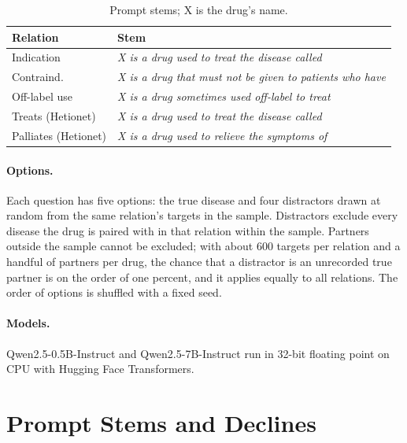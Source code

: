 \documentclass[letterpaper]{article} %
\begin{document}
\begin{table}[h]
\centering
\small
\begin{tabular}{>{\raggedright\arraybackslash}p{1.75cm}>{\raggedright\arraybackslash}p{5.35cm}}
\toprule
Relation & Stem \\
\midrule
Indication & \textit{X is a drug used to treat the disease called} \\
Contraind. & \textit{X is a drug that must not be given to patients who have} \\
Off-label use & \textit{X is a drug sometimes used off-label to treat} \\
Treats (Hetionet) & \textit{X is a drug used to treat the disease called} \\
Palliates (Hetionet) & \textit{X is a drug used to relieve the symptoms of} \\
\bottomrule
\end{tabular}
\caption{Prompt stems; X is the drug's name.}
\label{tab:stems}
\end{table}

\paragraph{Options.}
Each question has five options: the true disease and four distractors drawn
at random from the same relation's targets in the sample. Distractors exclude
every disease the drug is paired with in that relation within the sample.
Partners outside the sample cannot be excluded; with about 600 targets per
relation and a handful of partners per drug, the chance that a distractor is
an unrecorded true partner is on the order of one percent, and it applies
equally to all relations. The order of options is shuffled with a fixed seed.

\paragraph{Models.}
Qwen2.5-0.5B-Instruct and Qwen2.5-7B-Instruct \citep{qwen2025qwen25} run in
32-bit floating point on CPU with Hugging Face Transformers.

\section{Prompt Stems and Declines}
\end{document}
